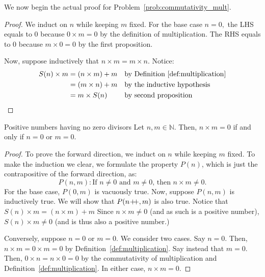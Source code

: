 We now begin the actual proof for Problem~\ref{prob:commutativity_mult}.
\begin{proof}
    We induct on $n$ while keeping $m$ fixed. 
    For the base case $n = 0,$ the LHS equals to 0 because $0 \times m = 0$ by the definition of multiplication.
    The RHS equals to 0 because $m \times 0 = 0$ by the first proposition.

    Now, suppose inductively that $n \times m = m \times n.$ Notice:
    \begin{align*}
        S(n) \times m &= (n \times m) + m &&\text{by Definition~\ref{def:multiplication}} \\
        &= (m \times n) + m &&\text{by the inductive hypothesis} \\
        &= m \times S(n) &&\text{by second proposition} \\
    \end{align*}
\end{proof}
\begin{problem}{Positive numbers having no zero divisors}
    Let $n, m \in \mathbb{N}.$
    Then, $n \times m = 0$ if and only if $n = 0$ or $m = 0.$
\end{problem}
\begin{proof}
    To prove the forward direction, we induct on $n$ while keeping $m$ fixed.
    To make the induction we clear, we formulate the property $P(n)$, which is just the contrapositive of the forward direction, as:
    $$P(n, m): \text{If } n \neq 0 \text{ and } m \neq 0 \text{, then } n \times m \neq 0.$$
    For the base case, $P(0, m)$ is vacuously true.
    Now, suppose $P(n, m)$ is inductively true. 
    We will show that $P(n \! +\!\!\!+, m)$ is also true. 
    Notice that $S(n) \times m = (n \times m) + m$
    Since $n \times m \neq 0$ (and as such is a positive number), $S(n) \times m \neq 0$ (and is thus also a positive number.) 


    Conversely, suppose $n = 0$ or $m = 0.$ We consider two cases.
    Say $n = 0.$ Then, $n \times m = 0 \times m = 0$ by Definition~\ref{def:multiplication}.
    Say instead that $m = 0.$ Then, $0 \times n = n \times 0 = 0$ by the commutativity of multiplication and Definition~\ref{def:multiplication}.
    In either case, $n \times m = 0.$
\end{proof}

